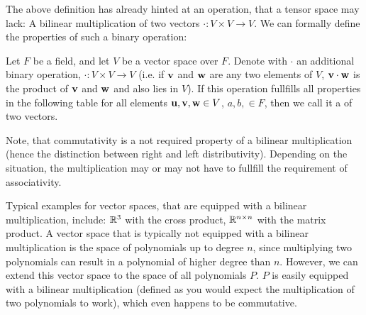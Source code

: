 The above definition has already hinted at an operation, that a tensor space may lack: A bilinear multiplication of two vectors $\cdot : V \times V \to V$. We can formally define the properties of such a binary operation:
\begin{definition}
	Let $F$ be a field, and let $V$ be a vector space over $F$. Denote with $\cdot$ an additional binary operation, $\cdot : V \times V \to V$ (i.e. if $\mathbf{v}$ and $\mathbf{w}$ are any two elements of $V$, $\mathbf{v}\cdot \mathbf{w}$ is the product of $\mathbf{v}$ and $\mathbf{w}$ and also lies in $V$). If this operation fullfills all properties in the following table for all elements $\mathbf{u},\mathbf{v},\mathbf{w}\in V$, $a,b,\in F$, then we call it a  of two vectors. 
\end{definition}
Note, that commutativity is a not required property of a bilinear multiplication (hence the distinction between right and left distributivity). Depending on the situation, the multiplication may or may not have to fullfill the requirement of associativity.

Typical examples for vector spaces, that are equipped with a bilinear multiplication, include: $\mathbb{R}^3$ with the cross product, $\mathbb{R}^{n\times n}$ with the matrix product. A vector space that is typically not equipped with a bilinear multiplication is the space of polynomials up to degree $n$, since multiplying two polynomials can result in a polynomial of higher degree than $n$. However, we can extend this vector space to the space of all polynomials $P$. $P$ is easily equipped with a bilinear multiplication (defined as you would expect the multiplication of two polynomials to work), which even happens to be commutative.

